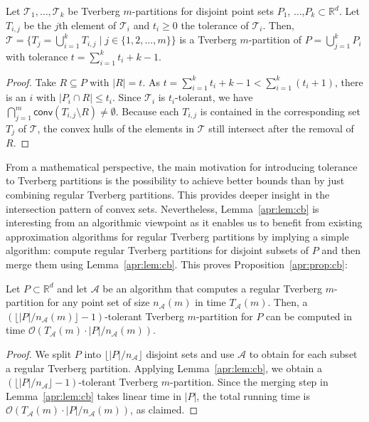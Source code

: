 \documentclass[oribibl,envcountsame,envcountsect]{llncs}
\newcommand{\mc}[1]{\ensuremath{\mathcal{#1}}}
\newcommand{\conv}{\mathsf{conv}}
\newcommand{\real}{\mathbb{R}}
\begin{document}
\begin{lemma}
  \label{apr:lem:cb}
  Let $\mc{T}_1,\ldots,\mc{T}_k$ be Tverberg $m$-partitions
  for disjoint point sets $P_1$, $\ldots$,$ P_k\subset\real^d$.
  Let $T_{i,j}$ be the $j$th element of $\mc{T}_i$ and $t_i \geq 0$
  the tolerance of $\mc{T}_i$.
  Then,
    $\mc{T} = \{ T_j = \textstyle\bigcup_{i=1}^k T_{i,j}  \mid j \in
    \{1,2,\ldots,m\}\}$
  is a Tverberg $m$-partition of $P = \bigcup_{j=1}^{k} P_i$ with tolerance
  $t = \sum_{i=1}^k t_i +k -1$.
\end{lemma}
\begin{proof}
  Take $R \subseteq P$ with $|R|=t$. As
  $t = \sum_{i=1}^k t_i +k -1 < \sum_{i=1}^k (t_i + 1)$, there is an $i$ with
  $|{P}_i \cap R| \leq t_i$.
  Since $\mc{T}_i$ is $t_i$-tolerant, we have
  $\bigcap_{j=1}^{m}\conv(T_{i,j} \setminus R) \neq \emptyset$. Because each
  $T_{i,j}$ is contained in the corresponding set $T_j$ of $\mc{T}$,
  the convex hulls of the elements in $\mc{T}$ still intersect after the removal
  of $R$.
\end{proof}

From a mathematical perspective, the main motivation for
introducing tolerance to Tverberg partitions is the possibility
to achieve better bounds than by just combining regular Tverberg
partitions. This provides deeper insight in the intersection pattern
of convex sets. Nevertheless, Lemma~\ref{apr:lem:cb} is interesting
from an algorithmic viewpoint as it enables us to benefit from
existing approximation algorithms for regular Tverberg partitions
by implying a simple algorithm: compute regular Tverberg
partitions for disjoint subsets of $P$ and then merge them using
Lemma~\ref{apr:lem:cb}. This proves Proposition~\ref{apr:prop:cb}:

\begin{proposition}
  Let $P\subset \real^d$ and let $\mc{A}$ be an
  algorithm that computes a regular Tverberg $m$-partition
  for any point set of size $n_\mc{A}(m)$ in time $T_{\mc{A}}(m)$.
  Then, a $\left(\lfloor |P|/n_{\mc{A}}(m) \rfloor -1\right)$-tolerant Tverberg
  $m$-partition for $P$ can be computed in time
  $\mc{O}\left(T_{\mc{A}}(m) \cdot |P| / n_{\mc{A}}(m) \right)$.
\end{proposition}
\begin{proof}
  We split $P$ into $\lfloor |P|/n_{\mc{A}} \rfloor$ disjoint sets and use
  $\mc{A}$ to obtain for each subset a regular Tverberg partition. Applying
  Lemma~\ref{apr:lem:cb}, we obtain a $(\lfloor |P|/n_{\mc{A}} \rfloor
  -1)$-tolerant Tverberg $m$-partition. Since the merging step in
  Lemma~\ref{apr:lem:cb} takes linear time in $|P|$, the total running time is
  $\mc{O}\left(T_{\mc{A}}(m) \cdot |P| / n_{\mc{A}}(m) \right)$, as
  claimed.
\end{proof}
\end{document}
